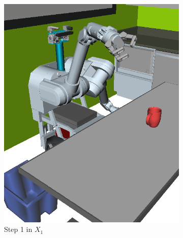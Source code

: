 {\begin{figure}
\begin{widepage}
\begin{subfigure}[t]{0.19\linewidth}
      \includegraphics[width=\columnwidth]{figs/testherb-b.png}
      \caption{Step 1 in $X_1$}
   \end{subfigure}
   \begin{subfigure}[t]{0.19\linewidth}
      \centering

\end{subfigure}
\end{widepage}
\end{figure}}
